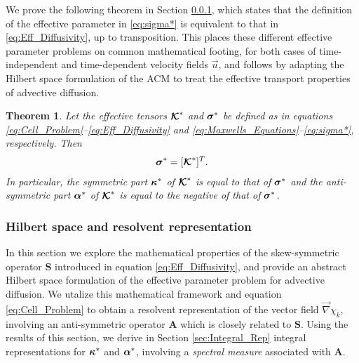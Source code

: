 \documentclass[11pt]{amsart}
\newcommand{\Sb}{\mathbf{S}}
\newcommand{\Ab}{\mathbf{A}}
\newcommand\Kbc{\mbox{\boldmath${\mathcal{K}}$}}
\newcommand\bsig{\mbox{\boldmath${\sigma}$}}
\newcommand\balpha{\mbox{\boldmath${\alpha}$}}
\newcommand\bkappa{\mbox{\boldmath${\kappa}$}}
\newtheorem{theorem}{Theorem}[section]
\begin{document}
We prove the following theorem in Section \ref{sec:Hilbert_Space}, which
states that the definition of the effective parameter in
\eqref{eq:sigma*} is equivalent to that in \eqref{eq:Eff_Diffusivity},
up to transposition. This places these different effective parameter
problems on common mathematical footing, for both cases of
time-independent and time-dependent velocity fields $\vec{u}$, and
follows by adapting the Hilbert space formulation of the ACM to treat
the effective transport properties of advective diffusion. 
%
\begin{theorem}\label{thm:kappa_sigma}
%
Let the effective tensors $\Kbc^*$ and $\bsig^*$ be defined as in
equations \eqref{eq:Cell_Problem}--\eqref{eq:Eff_Diffusivity} and
\eqref{eq:Maxwells_Equations}--\eqref{eq:sigma*}, respectively. Then   
%  
\begin{align}\label{eq:Eff_Equiv}
  \bsig^*=[\Kbc^*]^T.
\end{align}
%
In particular, the symmetric part $\bkappa^*$ of $\Kbc^*$ is equal to
that of $\bsig^*$ and the anti-symmetric part $\balpha^*$ of $\Kbc^*$
is equal to the negative of that of $\bsig^*$.
%
\end{theorem}
%
         





\subsubsection{Hilbert space and resolvent
  representation} \label{sec:Hilbert_Space}   
%
In this section we explore the mathematical properties of the
skew-symmetric operator $\Sb$ introduced in equation
\eqref{eq:Eff_Diffusivity}, and provide an abstract Hilbert space
formulation of the effective parameter problem for advective
diffusion. We utalize this mathematical framework and equation
\eqref{eq:Cell_Problem}  to obtain a resolvent representation of the
vector field $\vec{\nabla}\chi_k$, involving an anti-symmetric operator $\Ab$
which is closely related to $\Sb$. Using the results of this section,
we derive in Section \ref{sec:Integral_Rep} integral representations
for $\bkappa^*$ and $\balpha^*$, involving a \emph{spectral measure}
associated with $\Ab$.       
\end{document}
